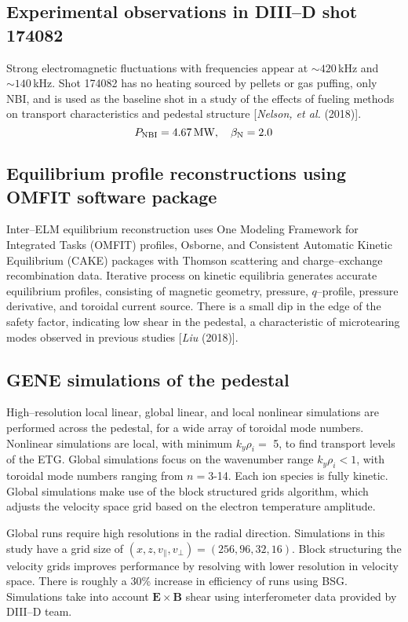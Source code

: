 \documentclass[a4paper,openany,12pt]{book}
\begin{document}
\subsection{Experimental observations in DIII--D shot 174082}

Strong electromagnetic fluctuations with frequencies appear at $\sim 420\,$kHz and $\sim 140\,$kHz. Shot 174082 has no heating sourced by pellets or gas puffing, only NBI, and is used as the baseline shot in a study of the effects of fueling methods on transport characteristics and pedestal structure [\emph{Nelson, et al.} (2018)].
$$P_{\rm NBI}=4.67\,\rm MW,\quad \beta_{\rm N}=2.0$$

\subsection{Equilibrium profile reconstructions using OMFIT software package}

Inter--ELM equilibrium reconstruction uses One Modeling Framework for Integrated Tasks (OMFIT) profiles, Osborne, and Consistent Automatic Kinetic Equilibrium (CAKE) packages with Thomson scattering and charge--exchange recombination data. Iterative process on kinetic equilibria generates accurate equilibrium profiles, consisting of magnetic geometry, pressure, $q$--profile, pressure derivative, and toroidal current source. There is a small dip in the edge of the safety factor, indicating low shear in the pedestal, a characteristic of microtearing modes observed in previous studies [\emph{Liu} (2018)].

\subsection{GENE simulations of the pedestal}

High--resolution local linear, global linear, and local nonlinear simulations are performed across the pedestal, for a wide array of toroidal mode numbers. Nonlinear simulations are local, with minimum $k_y\rho_i=$ 5, to find transport levels of the ETG. Global simulations focus on the wavenumber range $k_y\rho_i<1$, with toroidal mode numbers ranging from $n=3$-14. Each ion species is fully kinetic. Global simulations make use of the block structured grids algorithm, which adjusts the velocity space grid based on the electron temperature amplitude.

Global runs require high resolutions in the radial direction. Simulations in this study have a grid size of $(x, z, v_\|, v_\perp)=(256,96,32,16)$. Block structuring the velocity grids improves performance by resolving with lower resolution in velocity space. There is roughly a 30\% increase in efficiency of runs using BSG. Simulations take into account $\bm{E\times B}$ shear using interferometer data provided by DIII--D team.
\end{document}

